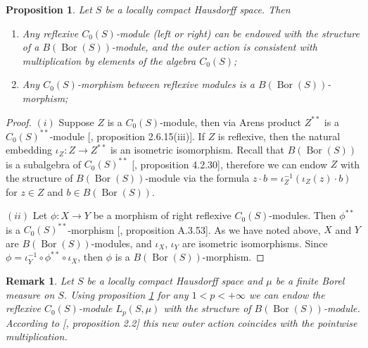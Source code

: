 \documentclass[12pt]{article}
\newtheorem{proposition}[theorem]{Proposition}
\newtheorem{remark}[theorem]{Remark}
\begin{document}
\begin{proposition}\label{C0SMorphBtwnReflxSpIsBMorph}
    Let $S$ be a locally compact Hausdorff space. Then 
    \begin{enumerate}[label = (\roman*)]
        \item Any reflexive $C_0(S)$-module (left or right) can be endowed 
        with the structure of a $B(\operatorname{Bor}(S))$-module, and the outer
        action is consistent with multiplication by elements of the 
        algebra $C_0(S)$;
        \item Any $C_0(S)$-morphism between reflexive modules 
        is a $B(\operatorname{Bor}(S))$-morphism;
    \end{enumerate}
\end{proposition}
\begin{proof} 
    $(i)$ Suppose $Z$ is a $C_0(S)$-module, then via Arens product 
    $Z^{**}$ is a $C_0(S)^{**}$-module 
    [\cite{DalBanAlgAutCont}, proposition 2.6.15(iii)]. If $Z$ is reflexive, 
    then the natural embedding $\iota_Z:Z\to Z^{**}$ is an isometric 
    isomorphism. Recall that $B(\operatorname{Bor}(S))$ is a subalgebra 
    of $C_0(S)^{**}$ [\cite{DalBanAlgAutCont}, proposition 4.2.30], 
    therefore we can endow $Z$ with the structure 
    of $B(\operatorname{Bor}(S))$-module via 
    the formula $z\cdot b=\iota_Z^{-1}(\iota_Z(z)\cdot b)$ for $z\in Z$ 
    and $b\in B(\operatorname{Bor}(S))$.
    
    $(ii)$ Let $\phi:X\to Y$ be a morphism of right reflexive $C_0(S)$-modules. 
    Then $\phi^{**}$ is a $C_0(S)^{**}$-morphism
    [\cite{DalBanAlgAutCont}, proposition A.3.53]. As we have noted above, $X$
    and $Y$ are $B(\operatorname{Bor}(S))$-modules, 
    and $\iota_X$, $\iota_Y$ are isometric isomorphisms. 
    Since $\phi=\iota_Y^{-1}\circ \phi^{**}\circ \iota_X$, then $\phi$ is 
    a $B(\operatorname{Bor}(S))$-morphism.
\end{proof}

\begin{remark}\label{C0SModIsBBorSMod}
    Let $S$ be a locally compact Hausdorff space and $\mu$ be a finite 
    Borel measure on $S$. Using proposition \ref{C0SMorphBtwnReflxSpIsBMorph} 
    for any $1<p<+\infty$ we can endow the 
    reflexive $C_0(S)$-module $L_p(S,\mu)$ with the structure 
    of $B(\operatorname{Bor}(S))$-module. According 
    to [\cite{HelTensProdAndMultModLp}, proposition 2.2] this new outer action 
    coincides with the pointwise multiplication.
\end{remark}
\end{document}
